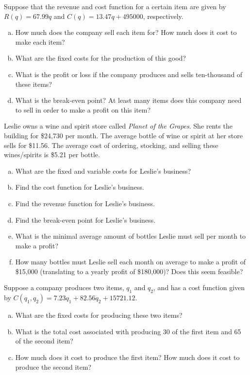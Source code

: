 \documentclass[11pt,letterpaper]{article}
\begin{document}

 Suppose that the revenue and cost function for a certain item are given by $R(q)= 67.99q$ and $C(q)= 13.47q + 495000$, respectively. 
	\begin{enumerate}[(a)]
	\item How much does the company sell each item for? How much does it cost to make each item?
	\item What are the fixed costs for the production of this good?
	\item What is the profit or loss if the company produces and sells ten-thousand of these items?
	\item What is the break-even point? At least many items does this company need to sell in order to make a profit on this item?
	\end{enumerate}



\newpage



 Leslie owns a wine and spirit store called \textit{Planet of the Grapes}. She rents the building for \$24,730 per month. The average bottle of wine or spirit at her store sells for \$11.56. The average cost of ordering, stocking, and selling these wines/spirits is \$5.21 per bottle. 
	\begin{enumerate}[(a)]
	\item What are the fixed and variable costs for Leslie's business?
	\item Find the cost function for Leslie's business.
	\item Find the revenue function for Leslie's business.
	\item Find the break-even point for Leslie's business. 
	\item What is the minimal average amount of bottles Leslie must sell per month to make a profit?
	\item How many bottles must Leslie sell each month on average to make a profit of \$15,000 (translating to a yearly profit of \$180,000)? Does this seem feasible?	
	\end{enumerate}



\newpage



 Suppose a company produces two items, $q_1$ and $q_2$, and has a cost function given by $C(q_1, q_2)= 7.23 q_1 + 82.56 q_2 + 15721.12$. 
	\begin{enumerate}[(a)]
	\item What are the fixed costs for producing these two items?
	\item What is the total cost associated with producing 30 of the first item and 65 of the second item?
	\item How much does it cost to produce the first item? How much does it cost to produce the second item?
	\end{enumerate}
\end{document}
